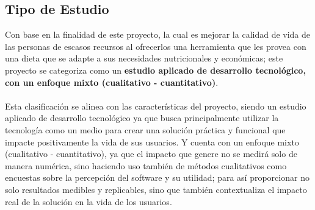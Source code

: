 \subsection{Tipo de Estudio}

\noindent Con base en la finalidad de este proyecto, la cual es mejorar la calidad de vida de las personas de escasos recursos al ofrecerlos  una herramienta que les provea con una dieta que se adapte a sus necesidades nutricionales y econ\'omicas; este proyecto se categoriza como un \textbf{estudio aplicado de desarrollo tecnol\'ogico, con un enfoque mixto (cualitativo - cuantitativo)}.
\\
\\
Esta clasificaci\'on se alinea con las caracter\'isticas del proyecto, siendo un estudio aplicado de desarrollo tecnol\'ogico ya que busca principalmente utilizar la tecnolog\'ia como un medio para crear una soluci\'on pr\'actica y funcional que impacte positivamente la vida de sus usuarios. Y cuenta con un enfoque mixto (cualitativo - cuantitativo), ya que el impacto que genere no se medir\'a solo de manera num\'erica, sino haciendo uso tambi\'en de m\'etodos cualitativos como encuestas sobre la percepci\'on del software y su utilidad; para as\'i proporcionar no solo resultados medibles y replicables, sino que tambi\'en contextualiza el impacto real de la soluci\'on en la vida de los usuarios.

